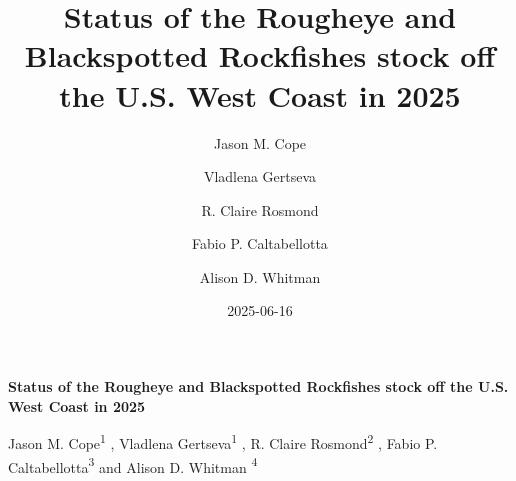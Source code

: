 \documentclass[
]{scrartcl}
\title{Status of the Rougheye and Blackspotted Rockfishes stock off the
U.S. West Coast in 2025}
\author{Jason M. Cope \and Vladlena Gertseva \and R. Claire
Rosmond \and Fabio P. Caltabellotta \and Alison D. Whitman}
\date{2025-06-16}
\begin{document}
  \begin{titlepage}

  \begin{minipage}[b][\textheight][s]{\textwidth}


  \raggedright




  {\huge\bfseries\nohyphens{Status of the Rougheye and Blackspotted
  Rockfishes stock off the U.S. West Coast in 2025}}\\[1\baselineskip]



  \vspace{1\baselineskip}


  \vspace{1\baselineskip}

   {\large{Jason M. Cope}}{\textsuperscript{1}}%
  ,
   {\large{Vladlena Gertseva}}{\textsuperscript{1}}%
  ,
   {\large{R. Claire Rosmond}}{\textsuperscript{2}}%
  ,
   {\large{Fabio P. Caltabellotta}}{\textsuperscript{3}}%
  { and \large{Alison D. Whitman}}%
  {\textsuperscript{4}}%



  \vspace{2\baselineskip}


\end{minipage}
\end{titlepage}
\end{document}

